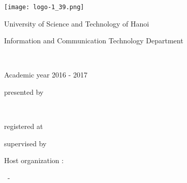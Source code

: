 \newpage
\empty
\thispagestyle{empty}

\begin{center}






\texttt{[image: logo-1\_39.png]}


\vspace*{1cm} 



{\huge University of Science and Technology of Hanoi }\\


\vspace*{1cm} 


{\large Information and Communication Technology Department}\\


\vspace*{1cm} 



{\huge \MasterLevel }\\


\vspace*{1cm} 

{\large Academic year 2016 -  2017}


\vfill


\noindent\hrulefill

\vspace*{2mm} 

{\Large \InternshipTitle }


\noindent\hrulefill





\vfill 



{\large presented by } \\

\vspace*{5mm} 


{\large \bf \FirstName~  \LastName} \\


\vspace*{5mm} 


{\large registered at \UniversityName } \\



\vspace*{5mm} 



{\large supervised by  \Supervisor } \\


\vspace*{20mm} 




{\large Host organization :   \HostOrganization }


\vspace*{5mm} 


{\large  \CityName~- \CountryName} \\

\vspace*{5mm} 







\end{center}
